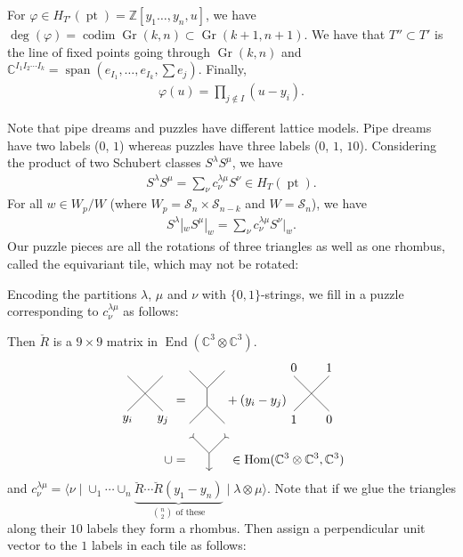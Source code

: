 \documentclass[12pt]{amsart}
\numberwithin{equation}{section}
\theoremstyle{definition}
\numberwithin{figure}{section}
\newcommand{\C}{\mathbb{C}}
\newcommand{\Z}{\mathbb{Z}}
\newcommand{\cS}{\mathcal{S}}
\newcommand{\pt}{\operatorname{pt}}
\newcommand{\codim}{\operatorname{codim}}
\newcommand{\End}{\operatorname{End}}
\newcommand{\Hom}{\operatorname{Hom}}
\newcommand{\spn}{\operatorname{span}}
\newcommand{\on}[1]{\operatorname{#1}}
\newcommand{\Gr}{\on{Gr}}
\newcommand{\Rcheck}{\breve{R}}
\begin{document}
For $\varphi\in H_{T'}(\pt)=\Z[y_1\ldots,y_n,u]$, we have $\deg(\varphi)=\codim\Gr(k,n)\subset\Gr(k+1,n+1)$. We have that $T''\subset T'$ is the line of fixed points going through $\Gr(k,n)$ and $\C^{I_1I_2\cdots I_k}=\spn(e_{I_1},\ldots,e_{I_k},\sum e_j)$. Finally,
\begin{align*}
    \varphi(u) = \prod_{j\notin I}(u-y_i).
\end{align*}

Note that pipe dreams and puzzles have different lattice models. Pipe dreams have two labels ($0$, $1$) whereas puzzles have three labels ($0$, $1$, $10$). Considering the product of two Schubert classes $S^\lambda S^\mu$, we have
\begin{align*}
    S^\lambda S^\mu = \sum_\nu c_\nu^{\lambda\mu} S^\nu\in H_T(\pt).
\end{align*}
For all $w\in W_p/W$ (where $W_p=\cS_n\times\cS_{n-k}$ and $W=\cS_n$), we have
\begin{align*}
    S^\lambda|_wS^\mu|_w = \sum_\nu c_\nu^{\lambda\mu}S^\nu|_w.
\end{align*}
Our puzzle pieces are all the rotations of three triangles as well as one rhombus, called the equivariant tile, which may not be rotated: 

Encoding the partitions $\lambda$, $\mu$ and $\nu$ with $\{0,1\}$-strings, we fill in a puzzle corresponding to $c_\nu^{\lambda\mu}$ as follows: 

Then $\Rcheck$ is a $9\times9$ matrix in $\End(\C^3\otimes\C^3)$.
\begin{align*}
    \tikz[baseline=6]{\draw(0,0)node[below]{$y_i$}--++(1,1);\draw(1,0)node[below]{$y_j$}--++(-1,1)} &=
    \tikz[baseline=16]{\draw(0,0)--++(1/2,1/2)--++(0,1/2)--++(-1/2,1/2);\draw(1/2,1)--++(1/2,1/2);\draw(1/2,1/2)--++(1/2,-1/2)} +
    (y_i-y_j)
    \tikz[baseline=6]{\draw(0,0)node[below]{$1$}--++(1,1)node[above]{$1$};\draw(1,0)node[below]{$0$}--++(-1,1)node[above]{$0$}} \\
    \cup &=
    \tikz[baseline=6]{\draw[>-](0,1)--++(1/2,-1/2);\draw[>-](1,1)--++(-1/2,-1/2);\draw[->](1/2,1/2)--++(0,-1/2)}
    \in \Hom(\C^3\otimes\C^3,\C^3)
\end{align*}
and $c_\nu^{\lambda\mu}=\langle\nu\mid\cup_1\cdots\cup_n\underbrace{\Rcheck\cdots\Rcheck(y_1-y_n)}_{\binom{n}{2}\text{ of these}}\mid\lambda\otimes\mu\rangle$. Note that if we glue the triangles along their $10$ labels they form a rhombus. Then assign a perpendicular unit vector to the $1$ labels in each tile as follows: 
\end{document}
